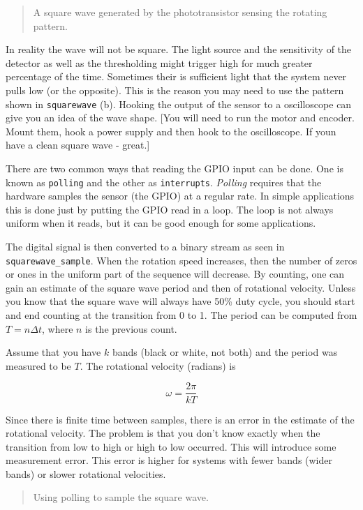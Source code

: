\begin{quote}
A square wave generated by the phototransistor sensing the rotating
pattern.
\end{quote}

In reality the wave will not be square. The light source and the
sensitivity of the detector as well as the thresholding might trigger
high for much greater percentage of the time. Sometimes their is
sufficient light that the system never pulls low (or the opposite). This
is the reason you may need to use the pattern shown in
\texttt{squarewave} (b). Hooking the output of the sensor to a
oscilloscope can give you an idea of the wave shape. {[}You will need to
run the motor and encoder. Mount them, hook a power supply and then hook
to the oscilloscope. If youn have a clean square wave - great.{]}

There are two common ways that reading the GPIO input can be done. One
is known as \texttt{polling} and the other as \texttt{interrupts}.
\emph{Polling} requires that the hardware samples the sensor (the GPIO)
at a regular rate. In simple applications this is done just by putting
the GPIO read in a loop. The loop is not always uniform when it reads,
but it can be good enough for some applications.

The digital signal is then converted to a binary stream as seen in
\texttt{squarewave\_sample}. When the rotation speed increases, then the
number of zeros or ones in the uniform part of the sequence will
decrease. By counting, one can gain an estimate of the square wave
period and then of rotational velocity. Unless you know that the square
wave will always have 50\% duty cycle, you should start and end counting
at the transition from 0 to 1. The period can be computed from
\(T = n \Delta t\), where \(n\) is the previous count.

Assume that you have \(k\) bands (black or white, not both) and the
period was measured to be \(T\). The rotational velocity (radians) is

\[\omega = \frac{2\pi}{kT}\]

Since there is finite time between samples, there is an error in the
estimate of the rotational velocity. The problem is that you don't know
exactly when the transition from low to high or high to low occurred.
This will introduce some measurement error. This error is higher for
systems with fewer bands (wider bands) or slower rotational velocities.

\begin{quote}
Using polling to sample the square wave.
\end{quote}

